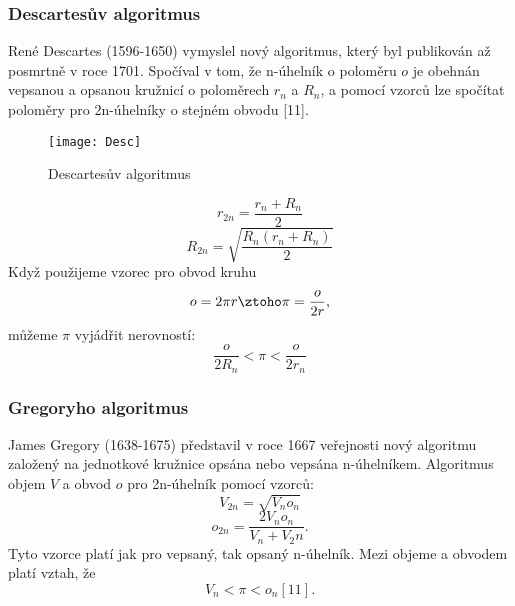 \documentclass[rocnikovka]{gzwroc} %
\begin{document}
\subsubsection{Descartesův algoritmus}
René Descartes (1596-1650) vymyslel nový algoritmus, který byl publikován až posmrtně v roce 1701. Spočíval v tom, že n-úhelník o poloměru $o$ je obehnán vepsanou a opsanou kružnicí o poloměrech $r_n$ a $R_n$, a pomocí vzorců lze spočítat poloměry pro 2n-úhelníky o stejném obvodu [11].
\begin{figure}[!ht]
\texttt{[image: Desc]}
\caption{Descartesův algoritmus}
\label{fig:kruh}
\end{figure}
\begin{equation}
r_{2n}=\frac{r_n+R_n}{2}
\end{equation}
\begin{equation}
R_{2n}=\sqrt{\frac{R_n(r_n+R_n)}{2}}
\end{equation}
Když použijeme vzorec pro obvod kruhu
$$
o=2\pi r \ztoho \pi=\frac{o}{2r},
$$
můžeme $\pi$ vyjádřit nerovností:
\begin{equation}
\frac{o}{2R_n}<\pi<\frac{o}{2r_n}
\end{equation}
\subsubsection{Gregoryho algoritmus}
James Gregory (1638-1675) představil v roce 1667 veřejnosti nový algoritmu založený na jednotkové kružnice opsána nebo vepsána n-úhelníkem. Algoritmus objem $V$ a obvod $o$ pro 2n-úhelník pomocí vzorců:
\begin{equation}
V_{2n}=\sqrt{V_no_n}
\end{equation}
\begin{equation}
o_{2n}=\frac{2V_no_n}{V_n+V_2n}.
\end{equation}
Tyto vzorce platí jak pro vepsaný, tak opsaný n-úhelník. Mezi objeme a obvodem platí vztah, že
$$
V_n<\pi<o_n [11]. 
$$
\end{document}
